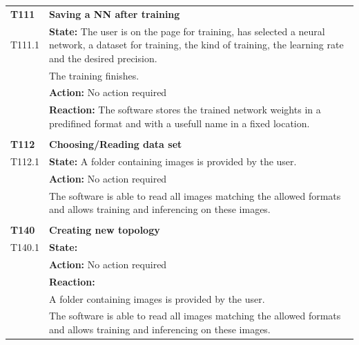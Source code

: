 \documentclass[parskip=full]{scrartcl}
\begin{document}
\begin{tabular}{p{2cm}p{12cm}}
\textbf{T111} & \textbf{Saving a NN after training}\\
T111.1 & \textbf{State:} The user is on the page for training, has selected a neural network, a dataset for training, the kind of training, the learning rate and the desired precision.\\
& The training finishes.\\
& \textbf{Action:} No action required\\
& \textbf{Reaction:} The software stores the trained network weights in a predifined format and with a usefull name in a fixed location.\\
& \\
\textbf{T112} & \textbf{Choosing/Reading data set}\\
T112.1 & \textbf{State:} A folder containing images is provided by the user.\\
& \textbf{Action:} No action required\\
& The software is able to read all images matching the allowed formats and allows training and inferencing on these images.\\

& \\
\textbf{T140} & \textbf{Creating new topology}\\
T140.1 & \textbf{State:} \\
& \textbf{Action:} No action required\\
& \textbf{Reaction:} \\
& A folder containing images is provided by the user.\\
& The software is able to read all images matching the allowed formats and allows training and inferencing on these images.\\

\end{tabular}
\end{document}
